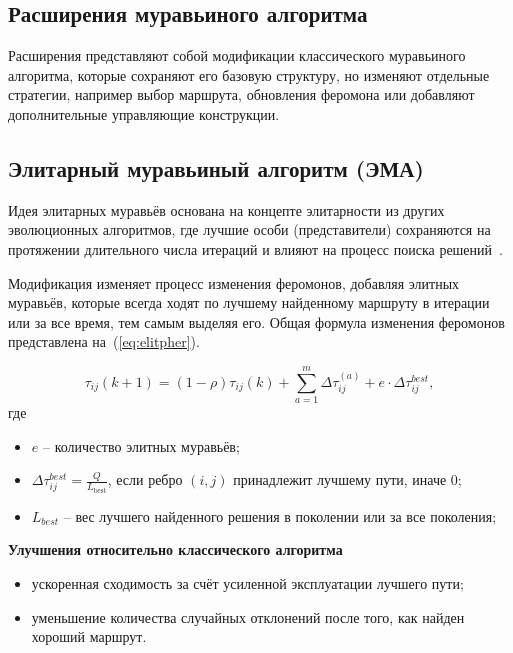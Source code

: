 \subsection{Расширения муравьиного алгоритма}

Расширения представляют собой модификации классического муравьиного алгоритма, которые сохраняют его базовую структуру, но изменяют отдельные стратегии, например выбор маршрута, обновления феромона или добавляют дополнительные управляющие конструкции.

\subsection*{Элитарный муравьиный алгоритм (ЭМА)}

Идея элитарных муравьёв основана на концепте элитарности из других эволюционных алгоритмов, где лучшие особи (представители) сохраняются на протяжении длительного числа итераций и влияют на процесс поиска решений~\cite{dorigo-book}.

Модификация изменяет процесс изменения феромонов, добавляя элитных муравьёв, которые всегда ходят по лучшему найденному маршруту в итерации или за все время, тем самым выделяя его. Общая формула изменения феромонов представлена на~(\ref{eq:elitpher}).

\begin{equation}
	\tau_{ij}(k+1)=(1 - \rho)\tau_{ij}(k) + \sum_{a=1}^{m} \Delta\tau_{ij}^{(a)} + e \cdot \Delta\tau_{ij}^{best},
	\label{eq:elitpher}
\end{equation}
где
\begin{itemize}
	\item $e$ -- количество элитных муравьёв;
	\item $\Delta\tau_{ij}^{best} = \frac{Q}{L_{\text{best}}}$, если ребро $(i,j)$ принадлежит лучшему пути, иначе $0$;
	\item $L_{best}$ -- вес лучшего найденного решения в поколении или за все поколения;
\end{itemize}

\textbf{Улучшения относительно классического алгоритма}

\begin{itemize}
	\item ускоренная сходимость за счёт усиленной эксплуатации лучшего пути;
	\item уменьшение количества случайных отклонений после того, как найден хороший маршрут.
\end{itemize}

